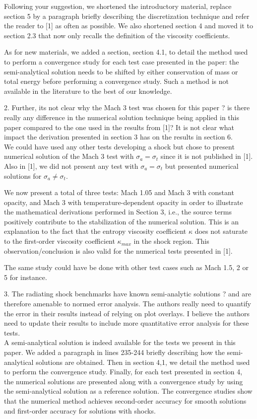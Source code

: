 \documentclass{article}
\begin{document}
Following your suggestion, we shortened the introductory material, replace section 5 by a paragraph briefly describing the discretization technique and refer the reader to [1] as often as possible. We also shortened section 4 and moved it to section 2.3 that now only recalls the definition of the viscosity coefficients. 

As for new materials, we added a section, section 4.1, to detail the method used to perform a convergence study for each test case presented in the paper: the semi-analytical solution needs to be shifted by either conservation of mass or total energy before performing a convergence study. Such a method is not available in the literature to the best of our knowledge.
\bigskip

{\color{blue}
2. Further, its not clear why the Mach 3 test was chosen for this paper ? is there really any difference in the numerical solution technique being applied in this paper compared to the one used in the results from [1]? It is not clear what impact the derivation presented in section 3 has on the results in section 6.\\}
We could have used any other tests developing a shock but chose to present numerical solution of the Mach 3 test with $\sigma_a = \sigma_t$ since it is not published in [1]. Also in [1], we did not present any test with $\sigma_a = \sigma_t$ but presented numerical solutions for $\sigma_a \neq \sigma_t$. 

We now present a total of three tests: Mach 1.05 and Mach 3 with constant opacity, and Mach 3 with temperature-dependent opacity in order to illustrate the mathematical derivations performed in Section 3, i.e., the source terms positively contribute to the stabilization of the numerical solution. This is an explanation to the fact that the entropy viscosity coefficient $\kappa$ does not saturate to the first-order viscosity coefficient $\kappa_{max}$ in the shock region. This observation/conclusion is also valid for the numerical tests presented in [1].

The same study could have be done with other test cases such as Mach 1.5, 2 or 5 for instance. 
\bigskip

{\color{blue}
3. 
The radiating shock benchmarks have known semi-analytic solutions ? and are therefore amenable to normed error analysis. The authors really need to quantify the error in their results instead of relying on plot overlays. I believe the authors need to update their results to include more quantitative error analysis for these tests.
\\}
A semi-analytical solution is indeed available for the tests we present in this paper. We added a paragraph in lines 235-244 briefly describing how the semi-analytical solutions are obtained. Then in section 4,1, we detail the method used to perform the convergence study. Finally, for each test presented in section 4, the numerical solutions are presented along with a convergence study by using the semi-analytical solution as a reference solution. 
The convergence studies show that the numerical method achieves second-order accuracy for smooth solutions and first-order accuracy for solutions with shocks. 
\bigskip
\end{document}
